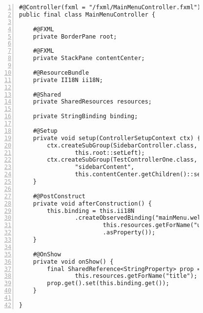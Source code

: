 \begin{figure}[H]
	\begin{lstlisting}[caption=Demo -- \texttt{MainMenuController}., captionpos=b, label=lst:mainmenu_controller, numbers=left, xleftmargin=1.7em, framexleftmargin=1.7em, nolol]
#@Controller(fxml = "/fxml/MainMenuController.fxml")
public final class MainMenuController {

    #@FXML
    private BorderPane root;

    #@FXML
    private StackPane contentCenter;

    #@ResourceBundle
    private II18N ii18N;

    #@Shared
    private SharedResources resources;

    private StringBinding binding;

    #@Setup
    private void setup(ControllerSetupContext ctx) {
        ctx.createSubGroup(SidebarController.class, "sidebar",
				this.root::setLeft);
        ctx.createSubGroup(TestControllerOne.class,
				"sidebarContent",
				this.contentCenter.getChildren()::setAll);
    }

    #@PostConstruct
    private void afterConstruction() {
        this.binding = this.ii18N
				.createObservedBinding("mainMenu.welcome",
						this.resources.getForName("username")
						.asProperty());
    }

    #@OnShow
    private void onShow() {
        final SharedReference<StringProperty> prop = 
				this.resources.getForName("title");
        prop.get().set(this.binding.get());
    }

}
	\end{lstlisting}
\end{figure}
